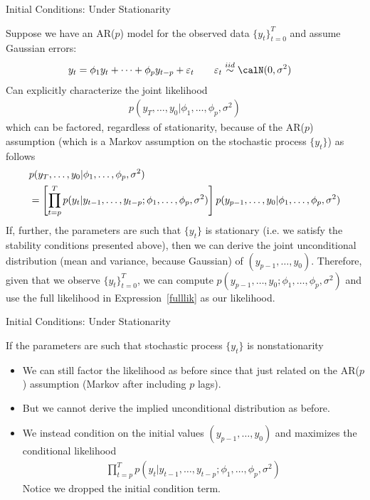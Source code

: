 \documentclass[aspectratio=169, handout]{beamer}
\newcommand{\iid}{\overset{iid}{\sim}}
\begin{document}
{\scriptsize
\begin{frame}{Initial Conditions: Under Stationarity}

Suppose we have an AR($p$) model for the observed data $\{y_t\}_{t=0}^T$
and assume Gaussian errors:
\begin{align*}
  y_t &= \phi_1 y_t + \cdots + \phi_p y_{t-p} + \varepsilon_t
  \qquad
  \varepsilon_t\iid\calN(0,\sigma^2)
\end{align*}
Can explicitly characterize the joint likelihood
\begin{align*}
  p(y_T,\ldots,y_0|\phi_1,\ldots,\phi_p,\sigma^2)
\end{align*}
\pause
which can be factored, \alert{regardless of stationarity}, because of
the AR($p$) assumption (which is a \alert{Markov} assumption on the
stochastic process $\{y_t\}$) as follows
\begin{align}
  &p(y_T,\ldots,y_0|\phi_1,\ldots,\phi_p,\sigma^2)
  \notag
  \\
  &=
  \left[
  \prod_{t=p}^T
  p(y_t|y_{t-1},\ldots,y_{t-p};\phi_1,\ldots,\phi_p,\sigma^2)
  \right]
  p(y_{p-1},\ldots,y_0|\phi_1,\ldots,\phi_p,\sigma^2)
  \label{fulllik}
\end{align}
\pause
If, further, the parameters are such that $\{y_t\}$ is
\alert{stationary} (i.e. we satisfy the stability conditions presented
above), then we can derive the joint unconditional distribution (mean
and variance, because Gaussian) of $(y_{p-1},\ldots,y_{0})$.
Therefore, given that we observe
$\{y_t\}_{t=0}^T$, we can compute
$p(y_{p-1},\ldots,y_{0};\phi_1,\ldots,\phi_p,\sigma^2)$ and use the full
likelihood in Expression~\ref{fulllik} as our likelihood.
\end{frame}
}

{\scriptsize
\begin{frame}{Initial Conditions: Under Stationarity}


If the parameters are such that stochastic process $\{y_t\}$ is
\alert{nonstationarity}
\begin{itemize}
  \item We can still factor the likelihood as before since that just
    related on the AR($p$) assumption (Markov after including $p$ lags).
  \pause
  \item But we cannot derive the implied unconditional distribution as
    before.
  \pause
  \item
    We instead \alert{condition} on the initial values
    $(y_{p-1},\ldots,y_0)$ and maximizes the conditional likelihood
    \begin{align}
      \prod_{t=p}^T
      p(y_t|y_{t-1},\ldots,y_{t-p};\phi_1,\ldots,\phi_p,\sigma^2)
      \label{partiallik}
    \end{align}
    Notice we dropped the initial condition term.
\end{itemize}
\end{frame}
}
\end{document}
